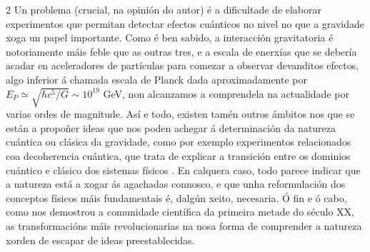 \begin{multicols}{2}
Un problema (crucial, na opinión do autor) é a dificultade de elaborar
experimentos que permitan detectar efectos cuánticos no nivel no que a
gravidade xoga un papel importante. Como é ben sabido, a interacción
gravitatoria é notoriamente máis feble que as outras tres, e a escala de
enerxías que se debería acadar en aceleradores de partículas para comezar a
observar devanditos efectos, algo inferior á chamada escala de Planck dada
aproximadamente por $E_P \simeq \sqrt{\hbar c^5 / G} \sim 10^{19}$ GeV, non
alcanzamos a comprendela na actualidade por varias ordes de magnitude. Así e
todo, existen tamén outros ámbitos nos que se están a propoñer ideas que nos
poden achegar á determinación da natureza cuántica ou clásica da gravidade,
como por exemplo experimentos relacionados coa decoherencia cuántica, que trata
de explicar a transición entre os dominios cuántico e clásico dos sistemas
físicos \cite{QD}. En calquera caso, todo parece indicar que a natureza está a
xogar ás agachadas connosco, e que unha reformulación dos conceptos físicos
máis fundamentais é, dalgún xeito, necesaria. Ó fin e ó cabo, como nos
demostrou a comunidade científica da primeira metade do século XX, as
transformacións máis revolucionarias na nosa forma de comprender a natureza
xorden de escapar de ideas preestablecidas.

\printbibliography

\end{multicols}
